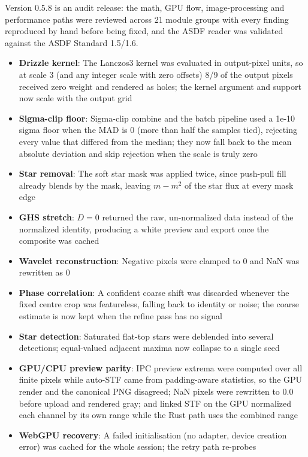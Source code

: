 \documentclass[11pt,a4paper]{article}
\begin{document}
    Version 0.5.8 is an audit release: the math, GPU flow, image-processing and performance paths were reviewed across 21 module groups with every finding reproduced by hand before being fixed, and the ASDF reader was validated against the ASDF Standard 1.5/1.6.

    \begin{itemize}[nosep]
    \item \textbf{Drizzle kernel}: The Lanczos3 kernel was evaluated in output-pixel units, so at scale 3 (and any integer scale with zero offsets) 8/9 of the output pixels received zero weight and rendered as holes; the kernel argument and support now scale with the output grid
    \item \textbf{Sigma-clip floor}: Sigma-clip combine and the batch pipeline used a 1e-10 sigma floor when the MAD is 0 (more than half the samples tied), rejecting every value that differed from the median; they now fall back to the mean absolute deviation and skip rejection when the scale is truly zero
    \item \textbf{Star removal}: The soft star mask was applied twice, since push-pull fill already blends by the mask, leaving $m - m^2$ of the star flux at every mask edge
    \item \textbf{GHS stretch}: $D = 0$ returned the raw, un-normalized data instead of the normalized identity, producing a white preview and export once the composite was cached
    \item \textbf{Wavelet reconstruction}: Negative pixels were clamped to 0 and NaN was rewritten as 0
    \item \textbf{Phase correlation}: A confident coarse shift was discarded whenever the fixed centre crop was featureless, falling back to identity or noise; the coarse estimate is now kept when the refine pass has no signal
    \item \textbf{Star detection}: Saturated flat-top stars were deblended into several detections; equal-valued adjacent maxima now collapse to a single seed
    \item \textbf{GPU/CPU preview parity}: IPC preview extrema were computed over all finite pixels while auto-STF came from padding-aware statistics, so the GPU render and the canonical PNG disagreed; NaN pixels were rewritten to 0.0 before upload and rendered gray; and linked STF on the GPU normalized each channel by its own range while the Rust path uses the combined range
    \item \textbf{WebGPU recovery}: A failed initialisation (no adapter, device creation error) was cached for the whole session; the retry path re-probes

\end{itemize}
\end{document}
